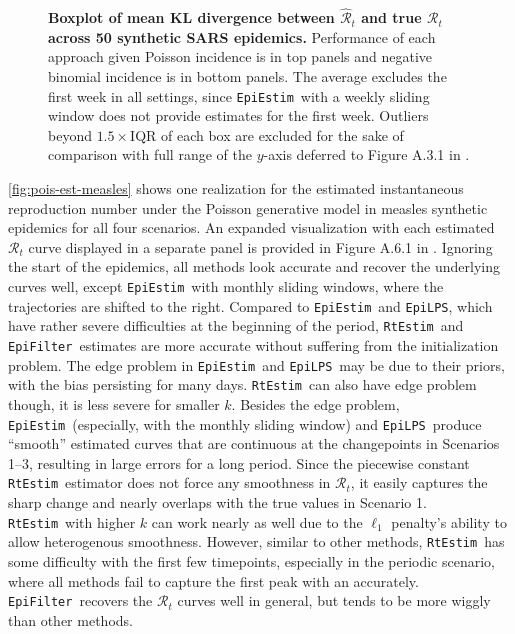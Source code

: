 \documentclass[10pt,letterpaper]{article}
\def\RtEstim{\texttt{RtEstim}}
\def\EpiEstim{\texttt{EpiEstim}}
\def\EpiLPS{\texttt{EpiLPS}}
\def\EpiFilter{\texttt{EpiFilter}}
\def\calR{\mathcal{R}}
\renewcommand{\hat}{\widehat}
\begin{document}
\begin{figure}[!t]
  \centering
  \caption{{\bf Boxplot of mean KL divergence between $\hat{\calR}_t$ and true
  $\calR_t$ across 50 synthetic SARS epidemics.} Performance of each approach given Poisson
  incidence is in top panels and negative binomial incidence is in bottom panels. The
  average excludes the first week in all settings, since \EpiEstim\ with a
  weekly sliding window does not provide estimates for the first week. Outliers
  beyond $1.5\times$IQR of each box are excluded for the sake of comparison with
  full range of the $y$-axis deferred to Figure A.3.1 in .} 
  \label{fig:kl-res-sars}
\end{figure}

\autoref{fig:pois-est-measles} shows one realization for the estimated
instantaneous reproduction number under the Poisson generative model in measles
synthetic epidemics for all four scenarios. An expanded visualization with each
estimated $\calR_t$ curve displayed in a separate panel is provided in Figure
A.6.1 in . Ignoring the start of the epidemics, all methods look
accurate and recover the underlying curves well, except \EpiEstim\ with monthly
sliding windows, where the trajectories are shifted to the right. Compared to
\EpiEstim\ and \EpiLPS, which have rather severe difficulties at the beginning
of the period, \RtEstim\ and \EpiFilter\ estimates are more accurate without
suffering from the initialization problem. The edge problem in \EpiEstim\ and
\EpiLPS\ may be due to their priors, with the bias persisting for many days.
\RtEstim\ can also have edge problem though, it is less severe for smaller $k$.
Besides the edge problem, \EpiEstim\ (especially, with the monthly sliding
window) and \EpiLPS\ produce ``smooth'' estimated curves that are continuous at
the changepoints in Scenarios 1--3, resulting in large errors for a long period.
Since the piecewise constant \RtEstim\ estimator does not force any smoothness
in $\calR_t$, it easily captures the sharp change and nearly overlaps with the
true values in Scenario 1. \RtEstim\ with higher $k$ can work nearly as well due
to the $\ell_1$ penalty's ability to allow heterogenous smoothness. However,
similar to other methods, \RtEstim\ has some difficulty with the first few
timepoints, especially in the periodic scenario, where all methods fail to
capture the first peak with an accurately. \EpiFilter\ recovers the $\calR_t$
curves well in general, but tends to be more wiggly than other methods. 
\end{document}
